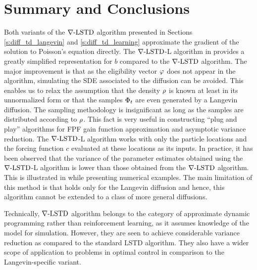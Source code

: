  \section{Summary and Conclusions}
 \label{s:ch2_conclusions}
 
Both variants of the $\nabla\text{-LSTD}$ algorithm presented in Sections \ref{s:diff_td_langevin} and \ref{s:diff_td_learning} approximate the gradient of the solution to Poisson's equation directly. 
The $\nabla\text{-LSTD}$-L algorithm in  provides a greatly simplified representation for $b$ compared to the $\nabla\text{-LSTD}$ algorithm. The major improvement is that as the eligibility vector $\varphi$ does not appear in the algorithm, simulating the SDE associated to the diffusion can be avoided. This enables us to relax the assumption that the density $\rho$ is known at least in its unnormalized form or that the samples $\Phi_t$ are even generated by a Langevin diffusion. The sampling methodology is insignificant as long as the samples are distributed according to $\rho$. This fact is very useful in constructing ``plug and play'' algorithms for FPF gain function approximation and asymptotic variance reduction. The $\nabla\text{-LSTD}$-L algorithm works with only the particle locations and the forcing function $c$ evaluated at these locations as its inputs. In practice, it has been observed that the variance of the parameter estimates obtained using the $\nabla\text{-LSTD}$-L algorithm is lower than those obtained from the $\nabla\text{-LSTD}$ algorithm. This is illustrated in  while presenting numerical examples. The main limitation of this method is that  holds only for the Langevin diffusion and hence, this algorithm cannot be extended to a class of more general diffusions.
 
Technically, $\nabla\text{-LSTD}$ algorithm belongs to the category of approximate dynamic programming rather than reinforcement learning, as it assumes knowledge of the model for simulation. However, they are seen to achieve considerable variance reduction as compared to the standard LSTD algorithm. They also have a wider scope of application to problems in optimal control in comparison to the Langevin-specific variant. 
 

